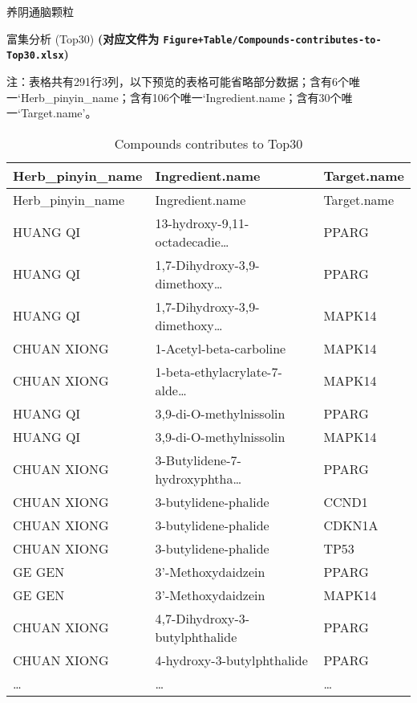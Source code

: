 \documentclass[
  ignorenonframetext,
]{beamer}
\begin{document}
\begin{frame}[fragile]{养阴通脑颗粒}
\begin{block}{富集分析 (Top30)}
\textbf{(对应文件为
\texttt{Figure+Table/Compounds-contributes-to-Top30.xlsx})}

\begin{center}\begin{tcolorbox}[colback=gray!10, colframe=gray!50, width=0.9\linewidth, arc=1mm, boxrule=0.5pt]注：表格共有291行3列，以下预览的表格可能省略部分数据；含有6个唯一`Herb\_pinyin\_name；含有106个唯一`Ingredient.name；含有30个唯一`Target.name'。
\end{tcolorbox}
\end{center}

\begin{longtable}[]{@{}lll@{}}
\caption{Compounds contributes to Top30}\tabularnewline
\toprule
Herb\_pinyin\_name & Ingredient.name & Target.name\tabularnewline
\midrule
\endfirsthead
\toprule
Herb\_pinyin\_name & Ingredient.name & Target.name\tabularnewline
\midrule
\endhead
HUANG QI & 13-hydroxy-9,11-octadecadie\ldots{} & PPARG\tabularnewline
HUANG QI & 1,7-Dihydroxy-3,9-dimethoxy\ldots{} & PPARG\tabularnewline
HUANG QI & 1,7-Dihydroxy-3,9-dimethoxy\ldots{} & MAPK14\tabularnewline
CHUAN XIONG & 1-Acetyl-beta-carboline & MAPK14\tabularnewline
CHUAN XIONG & 1-beta-ethylacrylate-7-alde\ldots{} &
MAPK14\tabularnewline
HUANG QI & 3,9-di-O-methylnissolin & PPARG\tabularnewline
HUANG QI & 3,9-di-O-methylnissolin & MAPK14\tabularnewline
CHUAN XIONG & 3-Butylidene-7-hydroxyphtha\ldots{} & PPARG\tabularnewline
CHUAN XIONG & 3-butylidene-phalide & CCND1\tabularnewline
CHUAN XIONG & 3-butylidene-phalide & CDKN1A\tabularnewline
CHUAN XIONG & 3-butylidene-phalide & TP53\tabularnewline
GE GEN & 3'-Methoxydaidzein & PPARG\tabularnewline
GE GEN & 3'-Methoxydaidzein & MAPK14\tabularnewline
CHUAN XIONG & 4,7-Dihydroxy-3-butylphthalide & PPARG\tabularnewline
CHUAN XIONG & 4-hydroxy-3-butylphthalide & PPARG\tabularnewline
\ldots{} & \ldots{} & \ldots{}\tabularnewline
\bottomrule
\end{longtable}
\end{block}
\end{frame}
\end{document}
